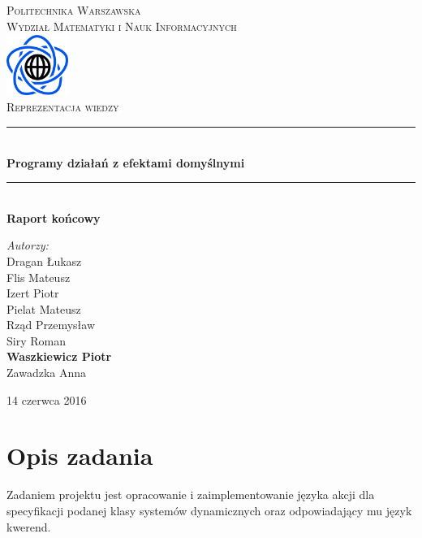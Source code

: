 \documentclass{article}
\begin{document}
\begin{titlepage}
\newcommand{\HRule}{\rule{\linewidth}{0.5mm}}
\newcommand{\Action}[1]{\textsc{#1}}
\center
\textsc{\LARGE Politechnika Warszawska}\\[0.3cm]
\textsc{\Large Wydział Matematyki i Nauk Informacyjnych}\\[0.6cm]
\includegraphics[width=2cm, height=2cm]{logo}\\[0.6cm]
\textsc{\Huge Reprezentacja wiedzy}\\[0.3cm]
\HRule \\[0.4cm]
{ \LARGE \bfseries Programy działań z efektami domyślnymi}\\[0.1cm]
 
\HRule \\[0.4cm]
{  \bfseries Raport końcowy}\\[1.2cm]
\begin{flushright}
\Large \emph{Autorzy:}\\[0.5cm]
Dragan Łukasz\\
Flis Mateusz\\
Izert Piotr\\
Pielat Mateusz\\
Rząd Przemysław\\
Siry Roman\\
\textbf{Waszkiewicz Piotr}\\
Zawadzka Anna\\[0.9cm]
\end{flushright}
\vfill
{\large 14 czerwca 2016}\\[1cm]
\end{titlepage}
\newpage

\tableofcontents
\newpage

\section{Opis zadania}

Zadaniem projektu jest opracowanie i zaimplementowanie języka akcji dla specyfikacji podanej klasy systemów dynamicznych oraz odpowiadający mu język kwerend.\\
\end{document}
